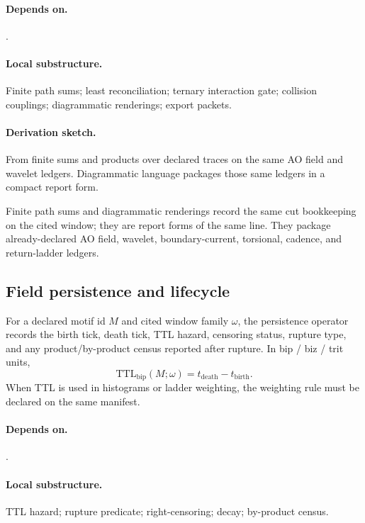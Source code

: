 \paragraph{Depends on.} .
\paragraph{Local substructure.} Finite path sums; least reconciliation; ternary interaction gate; collision couplings; diagrammatic renderings; export packets.
\paragraph{Derivation sketch.} From finite sums and products over declared traces on the same AO field and wavelet ledgers. Diagrammatic language packages those same ledgers in a compact report form.
\begin{remarkx}
Finite path sums and diagrammatic renderings record the same cut bookkeeping on the cited window; they are report forms of the same line. They package already-declared AO field, wavelet, boundary-current, torsional, cadence, and return-ladder ledgers.
\end{remarkx}


\subsection{Field persistence and lifecycle}\label{subsec:field-persistence-lifecycle}
\begin{definition}
\label{def:field-lifecycle-operator}
For a declared motif id $M$ and cited window family $\omega$, the persistence operator records the birth tick, death tick, TTL hazard, censoring status, rupture type, and any product/by-product census reported after rupture. In bip / biz / trit units,
\[
\mathrm{TTL}_{\mathrm{bip}}(M;\omega)=t_{\mathrm{death}}-t_{\mathrm{birth}}.
\]
When TTL is used in histograms or ladder weighting, the weighting rule must be declared on the same manifest.
\end{definition}

\paragraph{Depends on.} .
\paragraph{Local substructure.} TTL hazard; rupture predicate; right-censoring; decay; by-product census.
